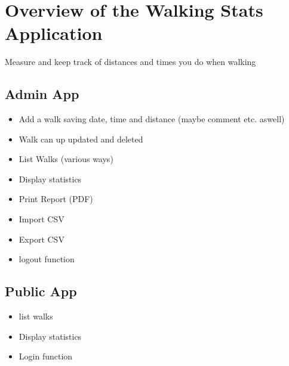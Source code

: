 \documentclass[10pt,a4paper,oneside]{article}
\author{Conor Gilmer}
\begin{document}
\section*{Overview of the Walking Stats Application}
Measure and keep track of distances and times you do when walking

\subsection*{Admin App}
\begin{itemize}
\item Add a walk saving date, time and distance (maybe comment etc. aswell)
\item Walk can up updated and deleted
\item List Walks (various ways)
\item Display statistics
\item Print Report (PDF)
\item Import CSV
\item Export CSV
\item logout function
\end{itemize}

\subsection*{Public App}
\begin{itemize}
\item list walks
\item Display statistics
\item Login function
\end{itemize}
\end{document}
